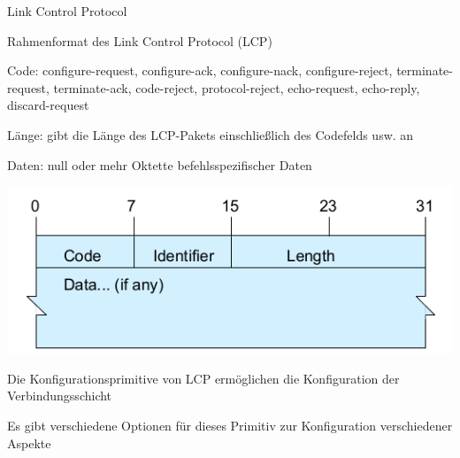 \documentclass[a4paper]{article}
\begin{document}
\begin{multicols}{3}
      Link Control Protocol
      \begin{itemize*}
            \item Rahmenformat des Link Control Protocol (LCP)
            \begin{itemize*}
                  \item Code: configure-request, configure-ack, configure-nack, configure-reject, terminate-request, terminate-ack, code-reject, protocol-reject, echo-request, echo-reply, discard-request
                  \item Länge: gibt die Länge des LCP-Pakets einschließlich des Codefelds usw. an
                  \item Daten: null oder mehr Oktette befehlsspezifischer Daten
                  \item \includegraphics[width=.8\linewidth]{Assets/NetworkSecurity-Point-to-Point-LCP.png}
            \end{itemize*}
            \item Die Konfigurationsprimitive von LCP ermöglichen die Konfiguration der Verbindungsschicht
            \item Es gibt verschiedene Optionen für dieses Primitiv zur Konfiguration verschiedener Aspekte %
      \end{itemize*}


\end{multicols}
\end{document}
